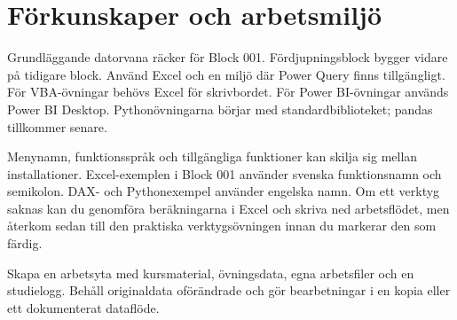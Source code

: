\documentclass[11pt,a4paper]{article}
\begin{document}
\section{Förkunskaper och arbetsmiljö}
Grundläggande datorvana räcker för Block 001. Fördjupningsblock bygger vidare på tidigare block. Använd Excel och en miljö där Power Query finns tillgängligt. För VBA-övningar behövs Excel för skrivbordet. För Power BI-övningar används Power BI Desktop. Pythonövningarna börjar med standardbiblioteket; pandas tillkommer senare.

Menynamn, funktionsspråk och tillgängliga funktioner kan skilja sig mellan installationer. Excel-exemplen i Block 001 använder svenska funktionsnamn och semikolon. DAX- och Pythonexempel använder engelska namn. Om ett verktyg saknas kan du genomföra beräkningarna i Excel och skriva ned arbetsflödet, men återkom sedan till den praktiska verktygsövningen innan du markerar den som färdig.

Skapa en arbetsyta med kursmaterial, övningsdata, egna arbetsfiler och en studielogg. Behåll originaldata oförändrade och gör bearbetningar i en kopia eller ett dokumenterat dataflöde.
\end{document}

